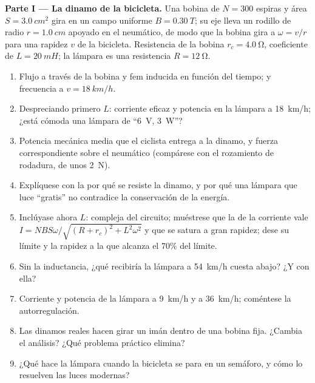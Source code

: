 \begin{problem}
\label{pb:b1:induction:1}

\medskip
\noindent\textbf{Parte I --- La dinamo de la bicicleta.}
Una bobina de $N = 300$ espiras y área $S = \qty{3.0}{cm^2}$ gira en un
campo uniforme $B = \qty{0.30}{T}$; su eje lleva un rodillo de radio
$r = \qty{1.0}{cm}$ apoyado en el neumático, de modo que la bobina gira a
$\omega = v/r$ para una rapidez $v$ de la bicicleta. Resistencia de la bobina $r_c = \qty{4.0}{\ohm}$,
coeficiente de  $L = \qty{20}{mH}$; la lámpara es una resistencia $R = \qty{12}{\ohm}$.
\begin{enumerate}
  \item Flujo a través de la bobina y fem inducida en función del tiempo;
         y frecuencia a $v = \qty{18}{km/h}$.
  \item Despreciando primero $L$: corriente eficaz y potencia en la
        lámpara a \qty{18}{km/h}; ¿está cómoda una lámpara de
        ``\qty{6}{V}, \qty{3}{W}''?
  \item Potencia mecánica media que el ciclista entrega a la dinamo, y
        fuerza correspondiente sobre el neumático (compárese con el
        rozamiento de rodadura, de unos \qty{2}{N}).
  \item Explíquese con la  por qué se resiste la dinamo, y por
        qué una lámpara que luce ``gratis'' no contradice la conservación
        de la energía.
  \item Inclúyase ahora $L$:  compleja del circuito; muéstrese
        que la  de la corriente vale $I = NBS\omega/\sqrt{(R + r_c)^2 + L^2\omega^2}$
        y que se satura a gran rapidez; dese su límite y la rapidez a la
        que alcanza el $70\%$ del límite.
  \item Sin la inductancia, ¿qué recibiría la lámpara a \qty{54}{km/h}
        cuesta abajo? ¿Y con ella?
  \item Corriente y potencia de la lámpara a \qty{9}{km/h} y a \qty{36}{km/h};
        coméntese la autorregulación.
  \item Las dinamos reales hacen girar un imán dentro de una bobina fija.
        ¿Cambia el análisis? ¿Qué problema práctico elimina?
  \item ¿Qué hace la lámpara cuando la bicicleta se para en un semáforo, y
        cómo lo resuelven las luces modernas?
\end{enumerate}


\end{problem}
